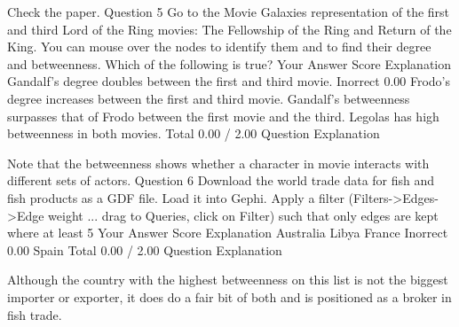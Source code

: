 Check the paper.
Question 5
Go to the Movie Galaxies representation of the first and third Lord of the Ring movies: The Fellowship of the Ring and Return of the King. You can mouse over the nodes to identify them and to find their degree and betweenness. Which of the following is true?
Your Answer		Score	Explanation
Gandalf's degree doubles between the first and third movie.	Inorrect	0.00	
Frodo's degree increases between the first and third movie.			
Gandalf's betweenness surpasses that of Frodo between the first movie and the third.			
Legolas has high betweenness in both movies.			
Total		0.00 / 2.00	
Question Explanation

Note that the betweenness shows whether a character in movie interacts with different sets of actors.
Question 6
Download the world trade data for fish and fish products as a GDF file. Load it into Gephi. Apply a filter (Filters->Edges->Edge weight ... drag to Queries, click on Filter) such that only edges are kept where at least 5%
Your Answer		Score	Explanation
Australia			
Libya			
France	Inorrect	0.00	
Spain			
Total		0.00 / 2.00	
Question Explanation

Although the country with the highest betweenness on this list is not the biggest importer or exporter, it does do a fair bit of both and is positioned as a broker in fish trade.
